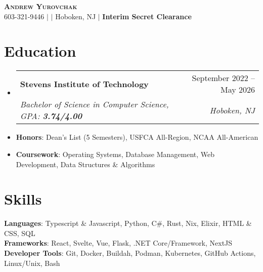 \documentclass[letterpaper,11pt]{article}
\makeatletter
\newcommand{\resumeItem}[1]{
  \item\small{
    {#1 \vspace{-2pt}}
  }
}
\newcommand{\resumeSubheading}[4]{
  \vspace{-2pt}\item
    \begin{tabular*}{0.97\textwidth}[t]{l@{\extracolsep{\fill}}r}
      \textbf{#1} & #2 \\
      \textit{\small#3} & \textit{\small #4} \\
    \end{tabular*}\vspace{-7pt}
}
\newcommand{\resumeSubItem}[1]{\resumeItem{#1}\vspace{-5pt}}
\newcommand{\resumeSubHeadingListStart}{\begin{itemize}[leftmargin=0.15in, label={}]}
\newcommand{\resumeSubHeadingListEnd}{\end{itemize}}
\makeatother
\begin{document}

\begin{center}
    \textbf{\Huge \scshape Andrew Yurovchak} \\ \vspace{3pt}
    \small 603-321-9446 $|$ \href{mailto:andy@yurovchak.net}{\underline{}} $|$ \small{Hoboken, NJ} 
    $|$
    \small{\textbf{Interim Secret Clearance}}
    \\ \vspace{-7pt}
\end{center}


\section{Education}
  \resumeSubHeadingListStart
    \resumeSubheading
      {Stevens Institute of Technology}{September 2022 -- May 2026}
      {Bachelor of Science in Computer Science, GPA: \textbf{3.74/4.00}}{Hoboken, NJ}
    \resumeSubItem{\textbf{Honors}: Dean's List (5 Semesters), USFCA All-Region, NCAA All-American}
    \resumeSubItem{\textbf{Coursework}: Operating Systems, Database Management, Web Development, Data Structures \& Algorithms}
    \vspace{-10pt}
  \resumeSubHeadingListEnd


\section{Skills}
 \resumeSubHeadingListStart
    \small{\item{
     \textbf{Languages}{: Typescript \& Javascript, Python, C\#, Rust, Nix, Elixir, HTML \& CSS, SQL} \\
     \textbf{Frameworks}{: React, Svelte, Vue, Flask, .NET Core/Framework, NextJS} \\
     \textbf{Developer Tools}{: Git, Docker, Buildah, Podman, Kubernetes, GitHub Actions, Linux/Unix, Bash}
    }\vspace{-5pt}}
 \resumeSubHeadingListEnd
\end{document}
